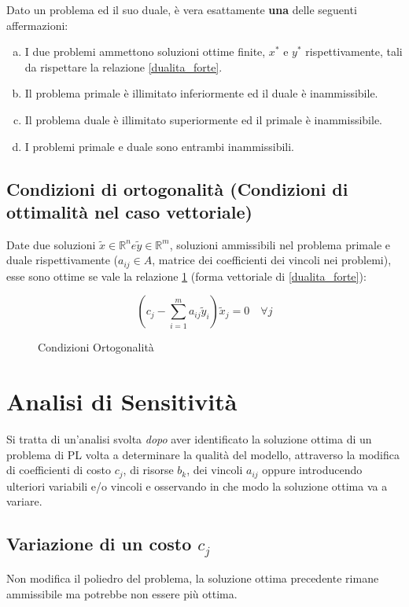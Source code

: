 \documentclass[\main/main.tex]{subfiles}
\begin{document}
\begin{theorem}
  Dato un problema ed il suo duale, è vera esattamente \textbf{una} delle seguenti affermazioni:
  \begin{enumerate}[a)]
    \item I due problemi ammettono soluzioni ottime finite, $x^*$ e $y^*$ rispettivamente, tali da rispettare la relazione \ref{dualita_forte}.
    \item Il problema primale è illimitato inferiormente ed il duale è inammissibile.
    \item Il problema duale è illimitato superiormente ed il primale è inammissibile.
    \item I problemi primale e duale sono entrambi inammissibili.
  \end{enumerate}
\end{theorem}

\subsection{Condizioni di ortogonalità (Condizioni di ottimalità nel caso vettoriale)}
\begin{theorem}
  Date due soluzioni $\tilde{x} \in \mathbb{R}^n e \tilde{y} \in \mathbb{R}^m$, soluzioni ammissibili nel problema primale e duale rispettivamente ($a_{ij} \in A$, matrice dei coefficienti dei vincoli nei problemi), esse sono ottime se vale la relazione \ref{dualita_forte_vettoriale} (forma vettoriale di \ref{dualita_forte}):
  \begin{figure}
    \[
      (c_j - \sum_{i=1}^m a_{ij} \tilde{y}_i)\tilde{x}_j = 0 \quad \forall j
    \]
    \caption{Condizioni Ortogonalità}
    \label{dualita_forte_vettoriale}
  \end{figure}
\end{theorem}

\section{Analisi di Sensitività}
Si tratta di un'analisi svolta \textit{dopo} aver identificato la soluzione ottima di un problema di PL volta a determinare la qualità del modello, attraverso la modifica di coefficienti di costo $c_j$, di risorse $b_k$, dei vincoli $a_{ij}$ oppure introducendo ulteriori variabili e/o vincoli e osservando in che modo la soluzione ottima va a variare.

\subsection{Variazione di un costo $c_j$} \label{cost_variation}
Non modifica il poliedro del problema, la soluzione ottima precedente rimane ammissibile ma potrebbe non essere più ottima.
\end{document}
